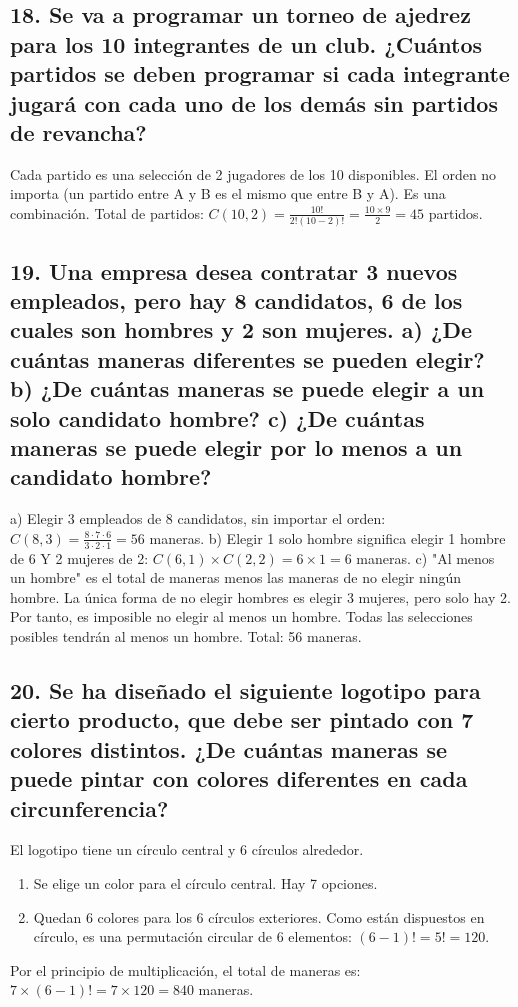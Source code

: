 \documentclass[11pt]{article}
\begin{document}
    \subsection*{18. Se va a programar un torneo de ajedrez para los 10 integrantes de un club. ¿Cuántos partidos se deben programar si cada integrante jugará con cada uno de los demás sin partidos de revancha?}
    Cada partido es una selección de 2 jugadores de los 10 disponibles. El orden no importa (un partido entre A y B es el mismo que entre B y A). Es una combinación.
    Total de partidos: $C(10,2) = \frac{10!}{2!(10-2)!} = \frac{10 \times 9}{2} = 45$ partidos.

    \subsection*{19. Una empresa desea contratar 3 nuevos empleados, pero hay 8 candidatos, 6 de los cuales son hombres y 2 son mujeres. a) ¿De cuántas maneras diferentes se pueden elegir? b) ¿De cuántas maneras se puede elegir a un solo candidato hombre? c) ¿De cuántas maneras se puede elegir por lo menos a un candidato hombre?}
    a) Elegir 3 empleados de 8 candidatos, sin importar el orden: $C(8,3) = \frac{8 \cdot 7 \cdot 6}{3 \cdot 2 \cdot 1} = 56$ maneras.
    b) Elegir 1 solo hombre significa elegir 1 hombre de 6 Y 2 mujeres de 2: $C(6,1) \times C(2,2) = 6 \times 1 = 6$ maneras.
    c) "Al menos un hombre" es el total de maneras menos las maneras de no elegir ningún hombre. La única forma de no elegir hombres es elegir 3 mujeres, pero solo hay 2. Por tanto, es imposible no elegir al menos un hombre. Todas las selecciones posibles tendrán al menos un hombre. Total: 56 maneras.

    \subsection*{20. Se ha diseñado el siguiente logotipo para cierto producto, que debe ser pintado con 7 colores distintos. ¿De cuántas maneras se puede pintar con colores diferentes en cada circunferencia?}
    El logotipo tiene un círculo central y 6 círculos alrededor.
    \begin{enumerate}
        \item Se elige un color para el círculo central. Hay 7 opciones.
        \item Quedan 6 colores para los 6 círculos exteriores. Como están dispuestos en círculo, es una permutación circular de 6 elementos: $(6-1)! = 5! = 120$.
    \end{enumerate}
    Por el principio de multiplicación, el total de maneras es: $7 \times (6-1)! = 7 \times 120 = 840$ maneras.
    
\end{document}
